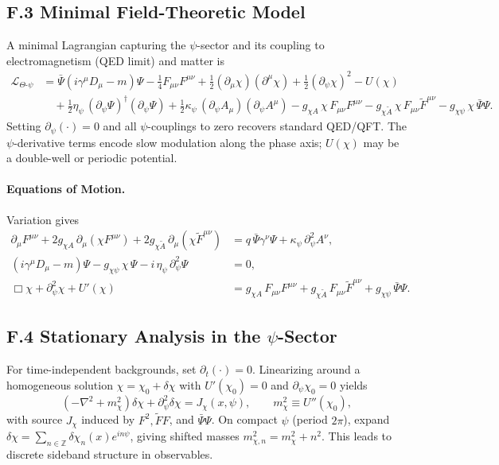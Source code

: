 \subsection*{F.3 Minimal Field-Theoretic Model}
A minimal Lagrangian capturing the $\psi$-sector and its coupling to electromagnetism (QED limit) and matter is
\begin{align}
\mathcal{L}_{\Theta\text{-}\psi} &= \bar{\Psi}(i\gamma^\mu D_\mu - m)\Psi - \frac{1}{4}F_{\mu\nu}F^{\mu\nu}
+ \frac{1}{2}(\partial_\mu \chi)(\partial^\mu \chi) + \frac{1}{2}(\partial_\psi \chi)^2 - U(\chi) \nonumber\\
&\quad + \frac{1}{2}\eta_\psi\,(\partial_\psi \Psi)^\dagger(\partial_\psi \Psi)
+ \frac{1}{2}\kappa_\psi\,(\partial_\psi A_\mu)(\partial_\psi A^\mu)
- g_{\chi A}\,\chi\,F_{\mu\nu}F^{\mu\nu}
- g_{\chi \tilde{A}}\,\chi\,F_{\mu\nu}\tilde{F}^{\mu\nu}
- g_{\chi \psi}\,\chi\,\bar{\Psi}\Psi.
\end{align}
Setting $\partial_\psi(\cdot)=0$ and all $\psi$-couplings to zero recovers standard QED/QFT. The $\psi$-derivative terms encode slow modulation along the phase axis; $U(\chi)$ may be a double-well or periodic potential.

\paragraph{Equations of Motion.} Variation gives
\begin{align}
\partial_\mu F^{\mu\nu} + 2g_{\chi A}\,\partial_\mu(\chi F^{\mu\nu}) + 2g_{\chi \tilde{A}}\,\partial_\mu(\chi \tilde{F}^{\mu\nu}) &= q\,\bar{\Psi}\gamma^\nu\Psi + \kappa_\psi\,\partial_\psi^2 A^\nu,\\
(i\gamma^\mu D_\mu - m)\Psi - g_{\chi \psi}\,\chi\,\Psi - i\,\eta_\psi\,\partial_\psi^2\Psi &= 0,\\
\Box \chi + \partial_\psi^2 \chi + U'(\chi) &= g_{\chi A}\,F_{\mu\nu}F^{\mu\nu} + g_{\chi \tilde{A}}\,F_{\mu\nu}\tilde{F}^{\mu\nu} + g_{\chi \psi}\,\bar{\Psi}\Psi.
\end{align}

\subsection*{F.4 Stationary Analysis in the $\psi$-Sector}
For time-independent backgrounds, set $\partial_t(\cdot)=0$. Linearizing around a homogeneous solution $\chi=\chi_0+\delta\chi$ with $U'(\chi_0)=0$ and $\partial_\psi \chi_0=0$ yields
\begin{equation}
\left(-\nabla^2 + m_\chi^2\right)\delta\chi + \partial_\psi^2 \delta\chi = J_\chi(x,\psi),
\qquad m_\chi^2 \equiv U''(\chi_0),
\end{equation}
with source $J_\chi$ induced by $F^2,\tilde F F$, and $\bar{\Psi}\Psi$. On compact $\psi$ (period $2\pi$), expand $\delta\chi=\sum_{n\in\mathbb{Z}}\delta\chi_n(x)e^{in\psi}$, giving shifted masses $m_{\chi,n}^2=m_\chi^2+n^2$. This leads to discrete sideband structure in observables.

